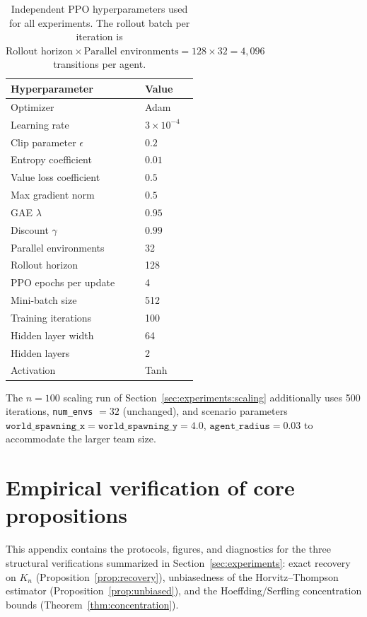 \documentclass{article}
\theoremstyle{plain}
\theoremstyle{definition}
\theoremstyle{remark}
\begin{document}
\begin{table}[ht]
\centering
\begin{tabular}{ll}
\toprule
\textbf{Hyperparameter} & \textbf{Value} \\
\midrule
Optimizer & Adam \\
Learning rate & $3 \times 10^{-4}$ \\
Clip parameter $\epsilon$ & $0.2$ \\
Entropy coefficient & $0.01$ \\
Value loss coefficient & $0.5$ \\
Max gradient norm & $0.5$ \\
GAE $\lambda$ & $0.95$ \\
Discount $\gamma$ & $0.99$ \\
Parallel environments & 32 \\
Rollout horizon & 128 \\
PPO epochs per update & 4 \\
Mini-batch size & 512 \\
Training iterations & 100 \\
Hidden layer width & 64 \\
Hidden layers & 2 \\
Activation & Tanh \\
\bottomrule
\end{tabular}
\caption{Independent PPO hyperparameters used for all experiments.
The rollout batch per iteration is $\text{Rollout horizon} \times
\text{Parallel environments} = 128 \times 32 = 4{,}096$ transitions
per agent.}
\label{tab:hyperparams}
\end{table}
The $n = 100$ scaling run of Section~\ref{sec:experiments:scaling} additionally uses 500 iterations, \texttt{num\_envs} $= 32$ (unchanged), and scenario parameters $\texttt{world\_spawning\_x} = \texttt{world\_spawning\_y} = 4.0$, $\texttt{agent\_radius} = 0.03$ to accommodate the larger team size.

\section{Empirical verification of core propositions}
\label{app:verify}

This appendix contains the protocols, figures, and diagnostics for
the three structural verifications summarized in
Section~\ref{sec:experiments}: exact recovery on $K_n$
(Proposition~\ref{prop:recovery}), unbiasedness of the
Horvitz--Thompson estimator (Proposition~\ref{prop:unbiased}), and
the Hoeffding/Serfling concentration bounds
(Theorem~\ref{thm:concentration}).
\end{document}
